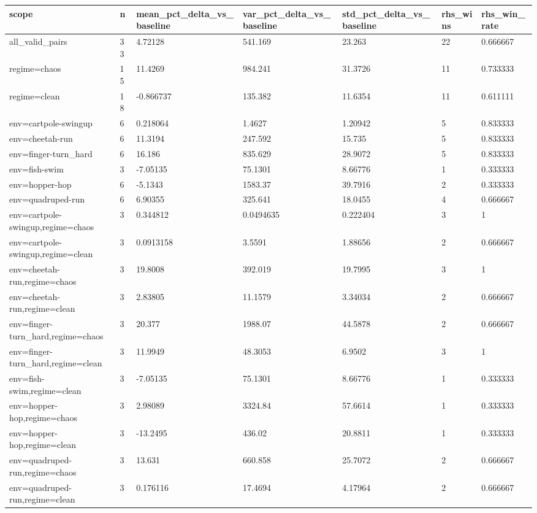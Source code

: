 \begin{tabular}{lllllll}
\toprule
scope & n & mean\_pct\_delta\_vs\_baseline & var\_pct\_delta\_vs\_baseline & std\_pct\_delta\_vs\_baseline & rhs\_wins & rhs\_win\_rate \\
\midrule
all\_valid\_pairs & 33 & 4.72128 & 541.169 & 23.263 & 22 & 0.666667 \\
regime=chaos & 15 & 11.4269 & 984.241 & 31.3726 & 11 & 0.733333 \\
regime=clean & 18 & -0.866737 & 135.382 & 11.6354 & 11 & 0.611111 \\
env=cartpole-swingup & 6 & 0.218064 & 1.4627 & 1.20942 & 5 & 0.833333 \\
env=cheetah-run & 6 & 11.3194 & 247.592 & 15.735 & 5 & 0.833333 \\
env=finger-turn\_hard & 6 & 16.186 & 835.629 & 28.9072 & 5 & 0.833333 \\
env=fish-swim & 3 & -7.05135 & 75.1301 & 8.66776 & 1 & 0.333333 \\
env=hopper-hop & 6 & -5.1343 & 1583.37 & 39.7916 & 2 & 0.333333 \\
env=quadruped-run & 6 & 6.90355 & 325.641 & 18.0455 & 4 & 0.666667 \\
env=cartpole-swingup,regime=chaos & 3 & 0.344812 & 0.0494635 & 0.222404 & 3 & 1 \\
env=cartpole-swingup,regime=clean & 3 & 0.0913158 & 3.5591 & 1.88656 & 2 & 0.666667 \\
env=cheetah-run,regime=chaos & 3 & 19.8008 & 392.019 & 19.7995 & 3 & 1 \\
env=cheetah-run,regime=clean & 3 & 2.83805 & 11.1579 & 3.34034 & 2 & 0.666667 \\
env=finger-turn\_hard,regime=chaos & 3 & 20.377 & 1988.07 & 44.5878 & 2 & 0.666667 \\
env=finger-turn\_hard,regime=clean & 3 & 11.9949 & 48.3053 & 6.9502 & 3 & 1 \\
env=fish-swim,regime=clean & 3 & -7.05135 & 75.1301 & 8.66776 & 1 & 0.333333 \\
env=hopper-hop,regime=chaos & 3 & 2.98089 & 3324.84 & 57.6614 & 1 & 0.333333 \\
env=hopper-hop,regime=clean & 3 & -13.2495 & 436.02 & 20.8811 & 1 & 0.333333 \\
env=quadruped-run,regime=chaos & 3 & 13.631 & 660.858 & 25.7072 & 2 & 0.666667 \\
env=quadruped-run,regime=clean & 3 & 0.176116 & 17.4694 & 4.17964 & 2 & 0.666667 \\
\bottomrule
\end{tabular}
